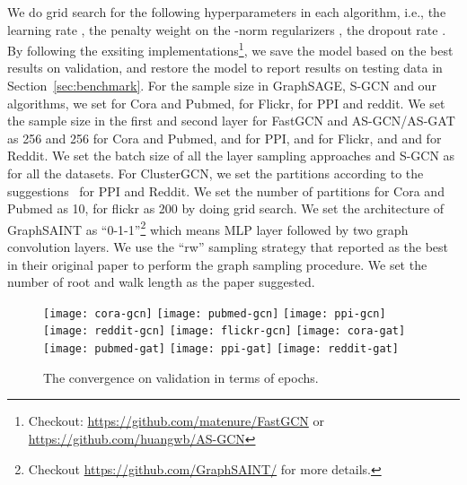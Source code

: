 \documentclass{article}
\begin{document}
We do grid search for the following hyperparameters 
in each algorithm, i.e., the learning rate ,
the penalty weight on the -norm regularizers 
,
the dropout rate . By following the exsiting
implementations\footnote{Checkout: 
\url{https://github.com/matenure/FastGCN} or 
\url{https://github.com/huangwb/AS-GCN}}, 
we save the model based on the best
results on validation, and restore the model to report 
results on testing data in Section~\ref{sec:benchmark}.
For the sample size  in GraphSAGE, S-GCN and our algorithms, 
we set  for Cora and Pubmed,
 for Flickr,  for PPI and reddit.
We set the sample size in the first and second layer
for FastGCN and AS-GCN/AS-GAT as 
256 and 256 for Cora and Pubmed,
 and  for PPI,  and 
for Flickr, and  and  for Reddit.
We set the batch size of all the layer sampling approaches
and S-GCN as  for all the datasets. For ClusterGCN, 
we set the partitions
according to the suggestions~\cite{chiang2019cluster} 
for PPI and Reddit. We set the number of partitions 
for Cora and Pubmed as 10, for flickr as 200
by doing grid search. We set the architecture of GraphSAINT as 
``0-1-1''\footnote{Checkout \url{https://github.com/GraphSAINT/} 
for more details.} which means MLP layer followed by two 
graph convolution layers. We use the ``rw'' sampling 
strategy that reported as the best in their original paper
to perform the graph sampling procedure. We set the number 
of root and walk length as the paper suggested.

\begin{figure*}[h]
\texttt{[image: cora-gcn]}
\texttt{[image: pubmed-gcn]}
\texttt{[image: ppi-gcn]}
\texttt{[image: reddit-gcn]}
\texttt{[image: flickr-gcn]}
\texttt{[image: cora-gat]}
\texttt{[image: pubmed-gat]}
\texttt{[image: ppi-gat]}
\texttt{[image: reddit-gat]}
\vspace{-0.2cm}
\caption{The convergence on validation in terms of epochs.}
\label{fig:convergence_gcn}
\end{figure*}
\vspace{-0.2cm}


\begin{comment}
\begin{figure*}[h]
\texttt{[image: cora-gat]}
\texttt{[image: pubmed-gat]}
\texttt{[image: ppi-gat]}
\texttt{[image: reddit-gat]}
\texttt{[image: flickr-gat]}
\vspace{-0.2cm}
\caption{The convergence on validation in terms of epochs.}
\label{fig:convergence_gat}
\end{figure*}
\vspace{-0.2cm}
\end{comment}
\end{document}
